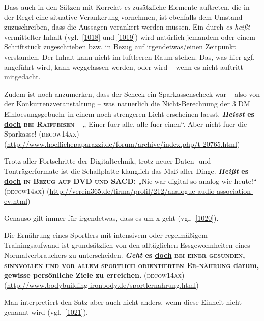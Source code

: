 Dass auch in den Sätzen mit Korrelat-\textit{es} zusätzliche Elemente auftreten, die in der Regel eine situative Verankerung vornehmen, ist ebenfalls dem Umstand zuzuschreiben, dass die Aussagen verankert werden müssen. Ein durch \textit{es heißt} vermittelter Inhalt (vgl.\ \ref{1018} und \ref{1019}) wird natürlich jemandem oder einem Schriftstück zugeschrieben bzw. in Bezug auf irgendetwas/einen Zeitpunkt verstanden. Der Inhalt kann nicht im luftleeren Raum stehen. Das, was hier ggf. angeführt wird, kann weggelassen werden, oder wird – wenn es nicht auftritt – mitgedacht.

\begin{exe}
	\ex\label{1018} 

	Zudem ist noch anzumerken, dass der Scheck ein Sparkassenscheck war – also von der Konkurrenz\-veranstaltung – was natuerlich die Nicht-Be\-rech\-nung der 3 		DM Einloesungsgebuehr in einem noch strengeren Licht erscheinen laesst. \textbf{\textit{Heisst} es \ul{doch} \textsc{bei Raiffeisen}} – „		Einer fuer alle, alle fuer einen“. Aber nicht fuer die Sparkasse! 					
	\hfill\hbox{\scshape(decow14ax)}
	\newline
	{\scriptsize(\url{http://www.hoeflichepaparazzi.de/forum/archive/index.php/t-20765.html})	}
\end{exe}

\begin{exe}
	\ex\label{1019} 

	Trotz aller Fortschritte der Digitaltechnik, trotz neuer Daten- und Tonträgerformate ist die Schallplatte klanglich das Maß aller Dinge. 					\textbf{\textit{Heißt} es \ul{doch} \textsc{in Bezug auf DVD und SACD}:} „Nie war digital so analog wie heute!“ 	 					
	\hfill\hbox{\scshape(decow14ax)}
	\newline
	{\scriptsize(\url{http://verein365.de/firma/profil/212/analogue-audio-association-ev.html})	}
\end{exe}						         
Genauso gilt immer für irgendetwas, dass es um x geht (vgl.\ \ref{1020}).

\begin{exe}
	\ex\label{1020} 

	Die Ernährung eines Sportlers mit intensivem oder regelmäßigem Trainingsaufwand ist grundsätzlich von den alltäglichen Essgewohnheiten eines 				Normalverbrauchers zu unterscheiden. \textbf{\textit{Geht} es \ul{doch} \textsc{bei einer gesunden, sinnvollen und vor allem sportlich orientierten Er-\linebreak nährung} darum, gewisse persönliche Ziele zu erreichen.}	
	\hfill\hbox{\scshape(decow14ax)}
	\newline
	{\scriptsize(\url{http://www.bodybuilding-ironbody.de/sportlernahrung.html})	}
\end{exe}
Man interpretiert den Satz aber auch nicht anders, wenn diese Einheit nicht genannt wird (vgl.\ \ref{1021}).

